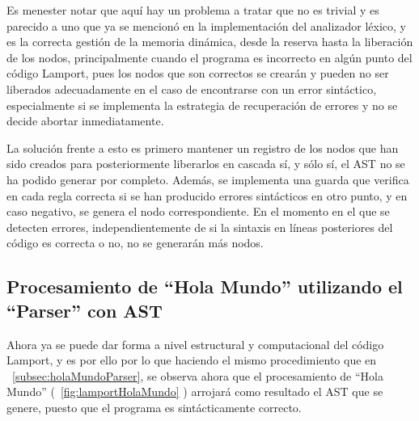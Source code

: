 Es menester notar que aquí hay un problema a tratar que no es trivial y es parecido a uno que ya se mencionó en la implementación del analizador léxico, y es la correcta gestión de la memoria dinámica, desde la reserva hasta la liberación de los nodos, principalmente cuando el programa es incorrecto en algún punto del código Lamport, pues los nodos que son correctos se crearán y pueden no ser liberados adecuadamente en el caso de encontrarse con un error sintáctico, especialmente si se implementa la estrategia de recuperación de errores y no se decide abortar inmediatamente. 


La solución frente a esto es primero mantener un registro de los nodos que han sido creados para posteriormente liberarlos en cascada sí, y sólo sí, el AST no se ha podido generar por completo. Además, se implementa una guarda que verifica en cada regla correcta si se han producido errores sintácticos en otro punto, y en caso negativo, se genera el nodo correspondiente. En el momento en el que se detecten errores, independientemente de si la sintaxis en líneas posteriores del código es correcta o no, no se generarán más nodos.

\subsection{Procesamiento de ``Hola Mundo'' utilizando el ``Parser'' con AST}
Ahora ya se puede dar forma a nivel estructural y computacional del código Lamport, y es por ello por lo que haciendo el mismo procedimiento que en ~\ref{subsec:holaMundoParser}, se observa ahora que el procesamiento de ``Hola Mundo'' (~\ref{fig:lamportHolaMundo} ) arrojará como resultado el AST que se genere, puesto que el programa es sintácticamente correcto.

